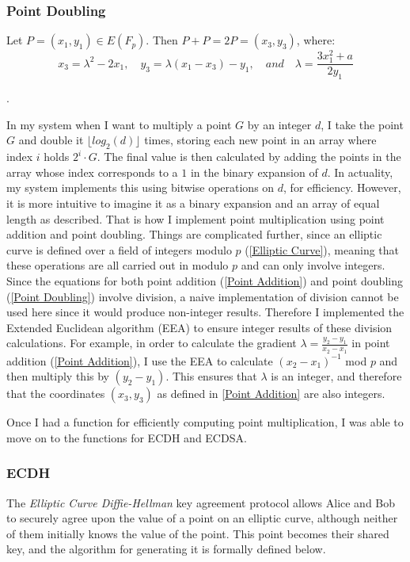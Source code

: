 \documentclass[12pt,a4paper]{article}
\begin{document}
\subsubsection{Point Doubling} \noindent \label{Point Doubling}
Let $P = (x_1,y_1) \in E(F_p)$. 
Then $P + P = 2P = (x_3,y_3)$, where:
\begin{equation}
    x_3 = \lambda^2 - 2x_1, \quad y_3 = \lambda(x_1 - x_3) - y_1, \quad and \quad \lambda = \frac{3x_1^2 + a}{2y_1}
\end{equation}

\cite{hankerson2003guide,lopez2000overview}.

\vspace{5mm}

In my system when I want to multiply a point $G$ by an integer $d$, 
I take the point $G$ and double it $\lfloor log_2(d) \rfloor$ times, storing each new point in an array where index $i$ holds $2^i \cdot G$. 
The final value is then calculated by adding the points in the array whose index corresponds to a $1$ in the binary expansion of $d$. 
In actuality, my system implements this using bitwise operations on $d$, for efficiency. 
However, it is more intuitive to imagine it as a binary expansion and an array of equal length as described. 
That is how I implement point multiplication using point addition and point doubling. 
Things are complicated further, since an elliptic curve is defined over a field of integers modulo $p$ (\ref{Elliptic Curve}), 
meaning that these operations are all carried out in modulo $p$ and can only involve integers. 
Since the equations for both point addition (\ref{Point Addition}) and point doubling (\ref{Point Doubling}) involve division, 
a naive implementation of division cannot be used here since it would produce non-integer results. 
Therefore I implemented the Extended Euclidean algorithm (EEA) to ensure integer results of these division calculations. 
For example, in order to calculate the gradient $\lambda = \frac{y_2-y_1}{x_2-x_1}$ in point addition (\ref{Point Addition}), 
I use the EEA to calculate $(x_2-x_1)^{-1}$ mod $p$ and then multiply this by $(y_2-y_1)$. 
This ensures that $\lambda$ is an integer, and therefore that the coordinates $(x_3,y_3)$ as defined in \ref{Point Addition} 
are also integers. 

Once I had a function for efficiently computing point multiplication, I was able to move on to the functions for ECDH and ECDSA. 

\subsubsection{ECDH} \noindent \label{ECDH}
The \emph{Elliptic Curve Diffie-Hellman} key agreement protocol allows Alice and Bob 
to securely agree upon the value of a point on an elliptic curve, although neither of them initially knows the value of the point. 
This point becomes their shared key, and the algorithm for generating it is formally defined below. 
\end{document}
